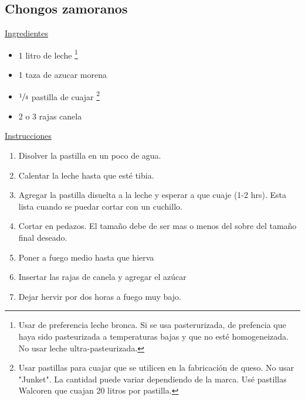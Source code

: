 \subsection{Chongos zamoranos}

\underline{Ingredientes}

\begin{itemize}
\item 1 litro de leche \footnote{Usar de preferencia leche bronca. Si se usa pasterurizada, de prefencia que haya sido pasteurizada a temperaturas bajas y que no esté homogeneizada. No usar leche ultra-pasteurizada.}
\item 1 taza de azucar morena
\item $\sfrac{1}{4}$ pastilla de cuajar \footnote{Usar pastillas para cuajar que se utilicen en la fabricación de queso. No usar "Junket". La cantidad puede variar dependiendo de la marca. Usé pastillas Walcoren que cuajan 20 litros por pastilla.}
\item 2 o 3 rajas canela
\end{itemize}

\underline{Instrucciones}
\begin{enumerate}
\item Disolver la pastilla en un poco de agua.
\item Calentar la leche hasta que esté tibia.
\item Agregar la pastilla disuelta a la leche y esperar a que cuaje (1-2 hrs). Esta lista cuando se puedar cortar con un cuchillo.
\item Cortar en  pedazos. El tamaño debe de ser mas o menos del sobre del tamaño final deseado.
\item Poner a fuego medio hasta que hierva
\item Insertar las rajas de canela y agregar el azúcar
\item Dejar hervir por dos horas a fuego muy bajo.
\end{enumerate}